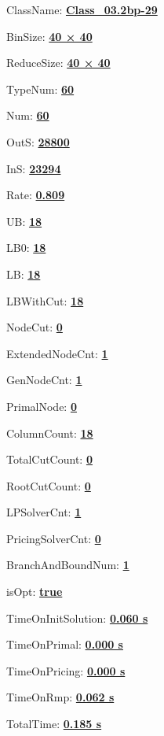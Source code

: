 \documentclass[11pt]{article}
\begin{document}
\pagestyle{empty}


ClassName: \underline{\textbf{Class_03.2bp-29}}
\par
BinSize: \underline{\textbf{40 × 40}}
\par
ReduceSize: \underline{\textbf{40 × 40}}
\par
TypeNum: \underline{\textbf{60}}
\par
Num: \underline{\textbf{60}}
\par
OutS: \underline{\textbf{28800}}
\par
InS: \underline{\textbf{23294}}
\par
Rate: \underline{\textbf{0.809}}
\par
UB: \underline{\textbf{18}}
\par
LB0: \underline{\textbf{18}}
\par
LB: \underline{\textbf{18}}
\par
LBWithCut: \underline{\textbf{18}}
\par
NodeCut: \underline{\textbf{0}}
\par
ExtendedNodeCnt: \underline{\textbf{1}}
\par
GenNodeCnt: \underline{\textbf{1}}
\par
PrimalNode: \underline{\textbf{0}}
\par
ColumnCount: \underline{\textbf{18}}
\par
TotalCutCount: \underline{\textbf{0}}
\par
RootCutCount: \underline{\textbf{0}}
\par
LPSolverCnt: \underline{\textbf{1}}
\par
PricingSolverCnt: \underline{\textbf{0}}
\par
BranchAndBoundNum: \underline{\textbf{1}}
\par
isOpt: \underline{\textbf{true}}
\par
TimeOnInitSolution: \underline{\textbf{0.060 s}}
\par
TimeOnPrimal: \underline{\textbf{0.000 s}}
\par
TimeOnPricing: \underline{\textbf{0.000 s}}
\par
TimeOnRmp: \underline{\textbf{0.062 s}}
\par
TotalTime: \underline{\textbf{0.185 s}}
\par
\newpage


\end{document}
